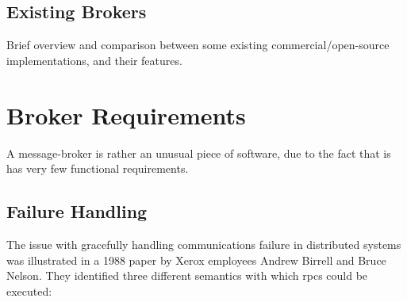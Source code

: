 \subsection{Existing Brokers}
\label{sub:Existing Brokers}

Brief overview and comparison between some existing commercial/open-source
implementations, and their features.


\section{Broker Requirements}
\label{sec:requirements}

A message-broker is rather an unusual piece of software, due to the fact that is
has very few functional requirements.

\subsection{Failure Handling}
\label{sub:failureHandling}

The issue with gracefully handling communications failure in distributed systems
was illustrated in a 1988 paper by Xerox employees Andrew Birrell and Bruce
Nelson\cite{Birrell:1988:IRP:59309.59336}. They identified three different
semantics with which \glspl{rpc} could be executed:

